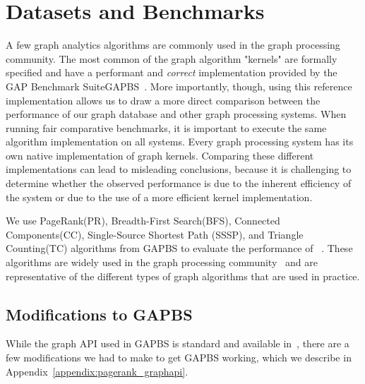 \section{Datasets and Benchmarks}
\label{eval:datasets_and_benchmarks}
A few graph analytics algorithms are commonly used in the graph processing community.
The most common of the graph algorithm "kernels" are formally specified and have a performant and \emph{correct} implementation provided by the GAP Benchmark Suite\ac{GAPBS}~\cite{DBLP:journals/corr/BeamerAP15}.
More importantly, though, using this reference implementation allows us to draw a more direct comparison between the performance of our graph database and other graph processing systems.
When running fair comparative benchmarks, it is important to execute the same algorithm implementation on all systems.
Every graph processing system has its own native implementation of graph kernels. 
Comparing these different implementations can lead to misleading conclusions, because it is challenging to determine whether the observed performance is due to the inherent efficiency of the system or due to the use of a more efficient kernel implementation.

We use PageRank(PR), Breadth-First Search(BFS), Connected Components(CC), Single-Source Shortest Path (SSSP), and Triangle Counting(TC) algorithms from \ac{GAPBS} to evaluate the performance of ~\project{}.
These algorithms are widely used in the graph processing community~\cite{mehrotra2024sok} and are representative of the different types of graph algorithms that are used in practice.

\subsection{Modifications to GAPBS}
While the graph API used in \ac{GAPBS} is standard and available in~\project{}, there are a few modifications we had to make to get \ac{GAPBS} working, which we describe in Appendix~\autoref{appendix:pagerank_graphapi}.

